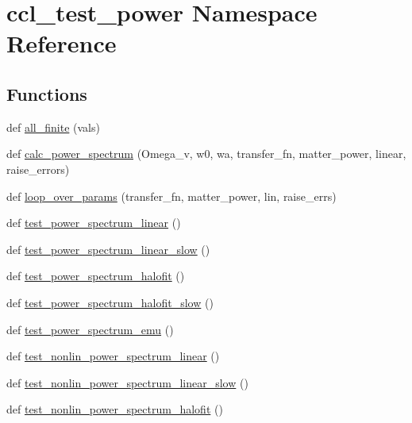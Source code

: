\hypertarget{namespaceccl__test__power}{}\section{ccl\+\_\+test\+\_\+power Namespace Reference}
\label{namespaceccl__test__power}
\subsection*{Functions}
\begin{DoxyCompactItemize}
\item 
def \mbox{\hyperlink{namespaceccl__test__power_a3be01a8e90fe6de68e6f4560c2ea3e17}{all\+\_\+finite}} (vals)
\item 
def \mbox{\hyperlink{namespaceccl__test__power_a62e19844920cdba6f368f81b3ac3452a}{calc\+\_\+power\+\_\+spectrum}} (Omega\+\_\+v, w0, wa, transfer\+\_\+fn, matter\+\_\+power, linear, raise\+\_\+errors)
\item 
def \mbox{\hyperlink{namespaceccl__test__power_a6a72c958a22a41eee6524ff79a2c68b1}{loop\+\_\+over\+\_\+params}} (transfer\+\_\+fn, matter\+\_\+power, lin, raise\+\_\+errs)
\item 
def \mbox{\hyperlink{namespaceccl__test__power_a2227cd6b570a8da2eb6e8246eeaa3a51}{test\+\_\+power\+\_\+spectrum\+\_\+linear}} ()
\item 
def \mbox{\hyperlink{namespaceccl__test__power_a92dc0303e3eecfbb9ceadb13d14cbb1c}{test\+\_\+power\+\_\+spectrum\+\_\+linear\+\_\+slow}} ()
\item 
def \mbox{\hyperlink{namespaceccl__test__power_a5715bce217f71fe9a7c7a41ac7525aac}{test\+\_\+power\+\_\+spectrum\+\_\+halofit}} ()
\item 
def \mbox{\hyperlink{namespaceccl__test__power_a0ab44977bf04c78a43252dcd7837c78d}{test\+\_\+power\+\_\+spectrum\+\_\+halofit\+\_\+slow}} ()
\item 
def \mbox{\hyperlink{namespaceccl__test__power_ac0f741beb7299903bb8a9262ce9d0d38}{test\+\_\+power\+\_\+spectrum\+\_\+emu}} ()
\item 
def \mbox{\hyperlink{namespaceccl__test__power_a0013a3039c9fcf8fb4ec6364be83a81b}{test\+\_\+nonlin\+\_\+power\+\_\+spectrum\+\_\+linear}} ()
\item 
def \mbox{\hyperlink{namespaceccl__test__power_a14141aede4702a292929dc31e09b5d81}{test\+\_\+nonlin\+\_\+power\+\_\+spectrum\+\_\+linear\+\_\+slow}} ()
\item 
def \mbox{\hyperlink{namespaceccl__test__power_a142d3f67b071ab1119a7edf3d2450916}{test\+\_\+nonlin\+\_\+power\+\_\+spectrum\+\_\+halofit}} ()

\end{DoxyCompactItemize}
